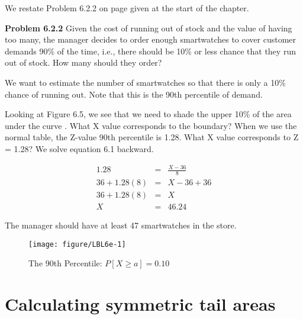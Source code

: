 \documentclass[11pt]{book}\usepackage[]{graphicx}\usepackage[]{color}
\begin{document}
We restate Problem 6.2.2 on page \pageref{LBL622} given at the start of the chapter.

\textbf{Problem 6.2.2}  Given the cost of running out of stock and the value of having too many, the manager decides to order enough smartwatches to cover customer demands 90\% of the time, i.e., there should be 10\% or less chance that they run out of stock.  How many should they order?

We want to estimate the number of smartwatches so that there is only a 10\% chance of running out.  Note that this is the 90th percentile of demand.

Looking at Figure 6.5, we see that we need to shade the upper 10\% of the area under the curve  .  What X value corresponds to the boundary?  When we use the normal table, the Z-value 90th percentile is 1.28.  What X value corresponds to Z = 1.28?  We solve equation 6.1 backward.

\begin{eqnarray*}
1.28 & = & \frac{X - 36}{8}  \\
36 + 1.28(8) & = & X-36 + 36  \\
36 + 1.28(8) & = & X  \\
X & = & 46.24 
\end{eqnarray*}

\newpage

The manager should have at least 47 smartwatches in the store.

\begin{figure}[ht]

\caption{The 90th Percentile: $P[X \ge a] = 0.10$ }




{\centering \texttt{[image: figure/LBL6e-1]} 

}




\end{figure}


\section{Calculating symmetric tail areas}
\end{document}
